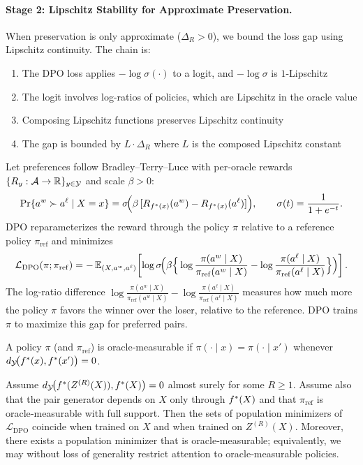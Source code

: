 \paragraph{Stage 2: Lipschitz Stability for Approximate Preservation.}
When preservation is only approximate ($\Delta_R > 0$), we bound the loss gap using Lipschitz continuity. The chain is:
\begin{enumerate}
    \item The DPO loss applies $-\log \sigma(\cdot)$ to a logit, and $-\log \sigma$ is $1$-Lipschitz
    \item The logit involves log-ratios of policies, which are Lipschitz in the oracle value
    \item Composing Lipschitz functions preserves Lipschitz continuity
    \item The gap is bounded by $L \cdot \Delta_R$ where $L$ is the composed Lipschitz constant
\end{enumerate}

Let preferences follow Bradley–Terry–Luce with per‑oracle rewards $\{R_y:\mathcal{A}\to\mathbb{R}\}_{y\in\mathcal{Y}}$ and scale $\beta>0$:
\[
\Pr\{a^w\succ a^\ell\mid X=x\}=\sigma\!\Big(\beta\,[R_{f^{\ast}(x)}(a^w)-R_{f^{\ast}(x)}(a^\ell)]\Big),
\qquad \sigma(t)=\frac{1}{1+e^{-t}}.
\]
DPO reparameterizes the reward through the policy $\pi$ relative to a reference policy $\pi_{\mathrm{ref}}$ and minimizes
\[
\mathcal L_{\mathrm{DPO}}(\pi;\pi_{\mathrm{ref}})=
-\,\mathbb{E}_{(X,a^w,a^\ell)}\!\left[\log \sigma\!\Big(\beta\Big\{\log\frac{\pi(a^w\mid X)}{\pi_{\mathrm{ref}}(a^w\mid X)}-\log\frac{\pi(a^\ell\mid X)}{\pi_{\mathrm{ref}}(a^\ell\mid X)}\Big\}\Big)\right].
\]
The log-ratio difference $\log\frac{\pi(a^w\mid X)}{\pi_{\mathrm{ref}}(a^w\mid X)}-\log\frac{\pi(a^\ell\mid X)}{\pi_{\mathrm{ref}}(a^\ell\mid X)}$ measures how much more the policy $\pi$ favors the winner over the loser, relative to the reference. DPO trains $\pi$ to maximize this gap for preferred pairs.

\begin{definition}
A policy $\pi$ (and $\pi_{\mathrm{ref}}$) is oracle‑measurable if $\pi(\cdot\mid x)=\pi(\cdot\mid x')$ whenever $d_{\mathcal{Y}}\!\big(f^{\ast}(x),f^{\ast}(x')\big)=0$.
\end{definition}

\begin{theorem}\label{thm:dpo-exact}
Assume $d_{\mathcal{Y}}\!\big(f^{\ast}(Z^{(R)}(X)),f^{\ast}(X)\big)=0$ almost surely for some $R\ge1$. Assume also that the pair generator depends on $X$ only through $f^{\ast}(X)$ and that $\pi_{\mathrm{ref}}$ is oracle‑measurable with full support. Then the sets of population minimizers of $\mathcal L_{\mathrm{DPO}}$ coincide when trained on $X$ and when trained on $Z^{(R)}(X)$. Moreover, there exists a population minimizer that is oracle‑measurable; equivalently, we may without loss of generality restrict attention to oracle‑measurable policies.
\end{theorem}

